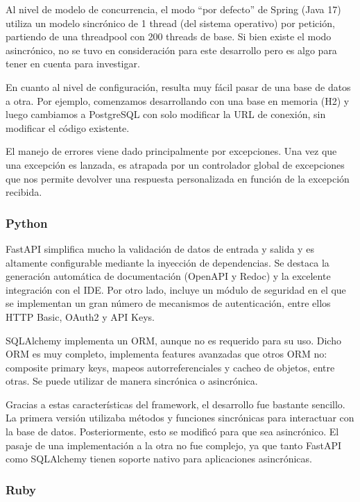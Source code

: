 \documentclass[11pt]{article}
\let\Oldsubsubsection\subsubsection
\renewcommand{\subsubsection}{\FloatBarrier\Oldsubsubsection}
\begin{document}
Al nivel de modelo de concurrencia, el modo “por defecto” de Spring (Java 17) utiliza un modelo sincrónico de 1 thread (del sistema operativo) por petición, partiendo de una threadpool con 200 threads de base. Si bien existe el modo asincrónico, no se tuvo en consideración para este desarrollo pero es algo para tener en cuenta para investigar.

En cuanto al nivel de configuración, resulta muy fácil pasar de una base de datos a otra. Por ejemplo, comenzamos desarrollando con una base en memoria (H2) y luego cambiamos a PostgreSQL con solo modificar la URL de conexión, sin modificar el código existente.

El manejo de errores viene dado principalmente por excepciones. Una vez que una excepción es lanzada, es atrapada por un controlador global de excepciones que nos permite devolver una respuesta personalizada en función de la excepción recibida.



\subsubsection{Python}

FastAPI simplifica mucho la validación de datos de entrada y salida y es altamente configurable mediante la inyección de dependencias. Se destaca la generación automática de documentación (OpenAPI y Redoc) y la excelente integración con el IDE. Por otro lado, incluye un módulo de seguridad en el que se implementan un gran número de mecanismos de autenticación, entre ellos HTTP Basic, OAuth2 y API Keys.

SQLAlchemy implementa un ORM, aunque no es requerido para su uso. Dicho ORM es muy completo, implementa features avanzadas que otros ORM no: composite primary keys, mapeos autorreferenciales y cacheo de objetos, entre otras. Se puede utilizar de manera sincrónica o asincrónica.

Gracias a estas características del framework, el desarrollo fue bastante sencillo. La primera versión utilizaba métodos y funciones sincrónicas para interactuar con la base de datos. Posteriormente, esto se modificó para que sea asincrónico. El pasaje de una implementación a la otra no fue complejo, ya que tanto FastAPI como SQLAlchemy tienen soporte nativo para aplicaciones asincrónicas.


\subsubsection{Ruby}
\end{document}
